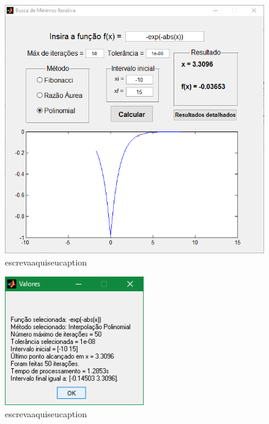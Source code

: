 \begin{figure}[H]
	\begin{center}	
		\includegraphics[width=14cm]{../interpol/f4_2_gui.PNG}
		\caption{escrevaaquiseucaption}
		\label{fig:f4_2_gui}
	\end{center}
\end{figure}

\begin{figure}[H]
	\begin{center}	
		\includegraphics[width=6cm]{../interpol/f4_2_resultados.PNG}
		\caption{escrevaaquiseucaption}
		\label{fig:f4_2_resultados}
	\end{center}
\end{figure}


